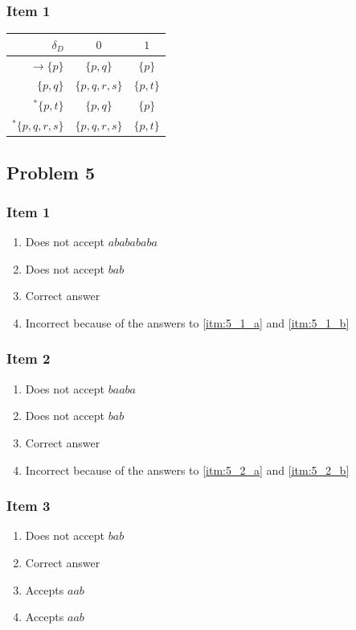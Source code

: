 \documentclass[docid=2012]{tcom_test1}
\begin{document}
\subsubsection{Item 1}
\begin{center}
\begin{tabular}{r | c c}
	$\delta_D                 $ & $0          $ & $1      $ \\ \hline
	$\rightarrow \{p        \}$ & $\{p,q    \}$ & $\{p  \}$ \\
	$            \{p,q      \}$ & $\{p,q,r,s\}$ & $\{p,t\}$ \\
	$       ^*\{p,      t\}$ & $\{p,q    \}$ & $\{p  \}$ \\
	$       ^*\{p,q,r,s  \}$ & $\{p,q,r,s\}$ & $\{p,t\}$
\end{tabular}
\end{center}
\setcounter{subsection}{4}
\subsection{Problem 5}
\subsubsection{Item 1}
\begin{enumerate}[label=(\alph*)]
	\item \label{itm:5_1_a} Does not accept $ababababa$
	\item \label{itm:5_1_b} Does not accept $bab$
	\item \label{itm:5_1_correct} Correct answer
	\item Incorrect because of the answers to \ref{itm:5_1_a} and \ref{itm:5_1_b} 
\end{enumerate}
\subsubsection{Item 2}
\begin{enumerate}[label=(\alph*)]
	\item \label{itm:5_2_a} Does not accept $baaba$
	\item \label{itm:5_2_b} Does not accept $bab$
	\item \label{itm:5_2_correct} Correct answer
	\item Incorrect because of the answers to \ref{itm:5_2_a} and \ref{itm:5_2_b} 
\end{enumerate}
\subsubsection{Item 3}
\begin{enumerate}[label=(\alph*)]
	\item Does not accept $bab$
	\item \label{itm:5_3_correct} Correct answer
	\item Accepts $aab$
	\item Accepts $aab$
\end{enumerate}
\setcounter{subsection}{5}
\end{document}

